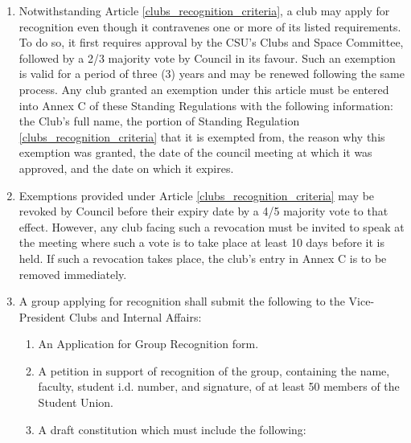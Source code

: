 \documentclass[oneside]{book}
\begin{document}
\begin{enumerate}
\item Notwithstanding Article \ref{clubs_recognition_criteria}, a club may apply for recognition even though it contravenes 
one or more of its listed requirements. To do so, it first requires approval by the CSU's 
Clubs and Space Committee, followed by a 2/3 majority vote by Council in its favour. 
Such an exemption is valid for a period of three (3) years and may be renewed following 
the same process. Any club granted an exemption under this article must be entered 
into Annex C of these Standing Regulations with the following information: the Club's 
full name, the portion of Standing Regulation \ref{clubs_recognition_criteria} that it is exempted from, the reason 
why this exemption was granted, the date of the council meeting at which it was 
approved, and the date on which it expires.
\item Exemptions provided under Article \ref{clubs_recognition_criteria} may be revoked by Council before their expiry 
date by a 4/5 majority vote to that effect. However, any club facing such a revocation 
must be invited to speak at the meeting where such a vote is to take place at least 10 
days before it is held. If such a revocation takes place, the club's entry in Annex C is to be 
removed immediately.
\item A group applying for recognition shall submit the following to the
Vice-President Clubs and Internal Affairs:

	\begin{enumerate}
	\item An Application for Group Recognition form. 
	\item A petition in support of recognition of the group, containing the
	name, faculty, student i.d. number, and signature, of at least 50
	members of the Student Union. 
	\item A draft constitution which must include the following: 


\end{enumerate}
\end{enumerate}
\end{document}
